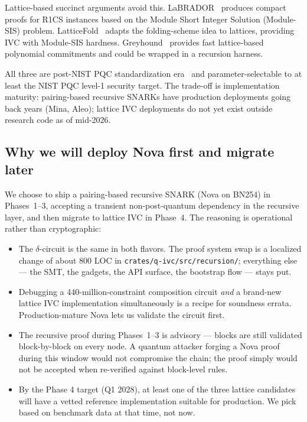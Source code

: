 \documentclass[11pt,a4paper]{article}
\begin{document}
Lattice-based succinct arguments avoid this. LaBRADOR~\cite{BeullensSeiler2023LaBRADOR}
produces compact proofs for R1CS instances based on the Module Short Integer
Solution (Module-SIS) problem. LatticeFold~\cite{BonehChenTairi2024LatticeFold}
adapts the folding-scheme idea to lattices, providing IVC with Module-SIS
hardness. Greyhound~\cite{NguyenSeiler2024Greyhound} provides fast lattice-based
polynomial commitments and could be wrapped in a recursion harness.

All three are post-NIST PQC standardization era~\cite{NISTPQC2022} and
parameter-selectable to at least the NIST PQC level-1 security target.
The trade-off is implementation maturity: pairing-based recursive SNARKs
have production deployments going back years (Mina, Aleo); lattice IVC
deployments do not yet exist outside research code as of mid-2026.

\subsection{Why we will deploy Nova first and migrate later}

We choose to ship a pairing-based recursive SNARK (Nova on BN254) in
Phases~1--3, accepting a transient non-post-quantum dependency in the
recursive layer, and then migrate to lattice IVC in Phase~4. The reasoning is
operational rather than cryptographic:

\begin{itemize}[leftmargin=*]
  \item The $\delta$-circuit is the same in both flavors. The proof
        system swap is a localized change of about 800 LOC in
        \texttt{crates/q-ivc/src/recursion/}; everything else --- the
        SMT, the gadgets, the API surface, the bootstrap flow --- stays put.
  \item Debugging a 440-million-constraint composition circuit
        \emph{and} a brand-new lattice IVC implementation simultaneously
        is a recipe for soundness errata. Production-mature Nova lets us
        validate the circuit first.
  \item The recursive proof during Phases~1--3 is advisory --- blocks
        are still validated block-by-block on every node. A quantum
        attacker forging a Nova proof during this window would not
        compromise the chain; the proof simply would not be accepted
        when re-verified against block-level rules.
  \item By the Phase 4 target (Q1 2028), at least one of the three
        lattice candidates will have a vetted reference implementation
        suitable for production. We pick based on benchmark data at
        that time, not now.
\end{itemize}
\end{document}
